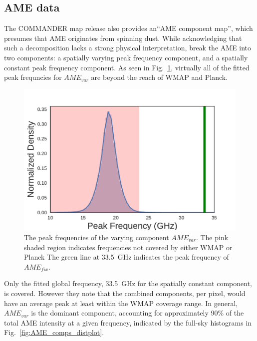       \subsection{AME data}

          The COMMANDER map release also provides an``AME component map'', which presumes that AME originates from spinning dust. While acknowledging that such a decomposition lacks a strong physical interpretation, \cite{planck15X} break the AME into two components: a spatially varying peak frequency component, and a spatially constant peak frequency component. As seen in Fig.~\ref{fig:AME_commander_freqdist}, virtually all of the fitted peak frequncies for $AME_{var}$ are beyond the reach of WMAP and Planck.
          \begin{figure}
            \includegraphics[width=\textwidth]{../Plots/ch_intro/AME_commander_freqdist.pdf}
            \centering
            \caption{The peak frequencies of the varying component $AME_{var}$.  The pink shaded region indicates frequencies not covered by either WMAP or Planck The green line at 33.5~GHz indicates the peak frequency of $AME_{fix}$.}
            \label{fig:AME_commander_freqdist}
          \end{figure}
          Only the fitted global frequency, 33.5~GHz for the spatially constant component, is covered. However they note that the combined components, per pixel, would have an average peak  at least within the WMAP coverage range. In general, $AME_{var}$ is the dominant component, accounting for approximately 90\% of the total AME intensity at a given frequency, indicated by the full-sky histograms in Fig.~\ref{fig:AME_comps_distplot}.
